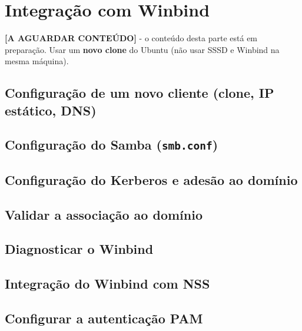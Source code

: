 
\clearpage
\section[Integração com Winbind]{Integração com Winbind}

\begin{notabox}[title={Nota}]
\textbf{[A AGUARDAR CONTEÚDO]} - o conteúdo desta parte está em preparação. Usar um \textbf{novo clone} do Ubuntu (não usar SSSD e Winbind na mesma máquina).
\end{notabox}

\subsection[Configuração de um novo cliente (clone, IP estático, DNS)]{Configuração de um novo cliente (clone, IP estático, DNS) \aguardar}

\subsection[Configuração do Samba (smb.conf)]{Configuração do Samba (\texttt{smb.conf}) \aguardar}

\subsection[Configuração do Kerberos e adesão ao domínio]{Configuração do Kerberos e adesão ao domínio \aguardar}

\subsection[Validar a associação ao domínio]{Validar a associação ao domínio \aguardar}

\subsection[Diagnosticar o Winbind]{Diagnosticar o Winbind \aguardar}

\subsection[Integração do Winbind com NSS]{Integração do Winbind com NSS \aguardar}

\subsection[Configurar a autenticação PAM]{Configurar a autenticação PAM \aguardar}

